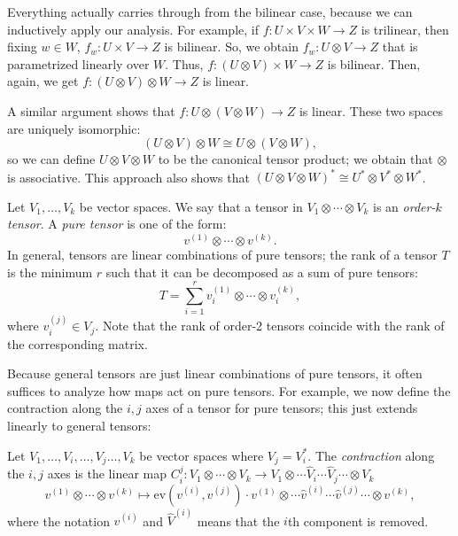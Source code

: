 Everything actually carries through from the bilinear case, because we
can inductively apply our analysis. For example, if $f: U \times V
\times W \to Z$ is trilinear, then fixing $w \in W$, $f_w : U \times V
\to Z$ is bilinear. So, we obtain $f_w : U \otimes V \to Z$ that is
parametrized linearly over $W$. Thus, $f: (U \otimes V) \times W \to
Z$ is bilinear. Then, again, we get $f: (U \otimes V) \otimes W \to Z$
is linear. 


A similar argument shows that $f : U \otimes (V \otimes W) \to Z$ is
linear. These two spaces are uniquely isomorphic: 
\[(U \otimes V) \otimes W \cong U \otimes (V \otimes W),\]
so we can define $U \otimes V \otimes W$ to be the canonical tensor
product; we obtain that $\otimes$ is associative. This approach also
shows that $(U \otimes V \otimes W)^* \cong U^* \otimes V^* \otimes
W^*$. 


\begin{definition}
  Let $V_1, \dotsc, V_k$ be vector spaces. We say that a tensor in
  $V_1 \otimes \dotsm \otimes V_k$ is an \emph{order-$k$ tensor}. A
  \emph{pure tensor} is one of the form: 
  \[v^{(1)} \otimes \dotsm \otimes v^{(k)}.\]
  In general, tensors are linear combinations of pure tensors; the
  rank of a tensor $T$  is the minimum $r$ such that it can be
  decomposed as a sum of pure tensors: 
  \[T = \sum_{i=1}^r v^{(1)}_i \otimes \dotsm \otimes v^{(k)}_i,\]
  where $v^{(j)}_i \in V_j$. Note that the rank of order-2 tensors
  coincide with the rank of the corresponding matrix. 
\end{definition}



Because general tensors are just linear combinations of pure tensors,
it often suffices to analyze how maps act on pure tensors. For
example, we now define the contraction along the $i,j$ axes of a
tensor for pure tensors; this just extends linearly to general
tensors: 
\begin{definition}
  Let $V_1, \dotsc, V_i, \dotsc, V_j \dotsc, V_k$ be vector spaces
  where $V_j = V_i^*$. The \emph{contraction} along the $i,j$ axes is
  the linear map $C_i^j : V_1 \otimes \dotsm \otimes V_k \to V_1
  \otimes \dotsm \hat{V}_i \dotsm \hat{V}_j \dotsm \otimes V_k$  
  \[v^{(1)} \otimes  \dotsm \otimes v^{(k)} \mapsto
  \mathrm{ev}(v^{(i)}, v^{(j)}) \cdot v^{(1)} \otimes \dotsm
  \hat{v}^{(i)} \dotsm \hat{v}^{(j)} \dotsm \otimes v^{(k)},\] 
  where the notation $\hat{v}^{(i)}$ and $\hat{V}^{(i)}$ means that
  the $i$th component is removed. 
\end{definition}




